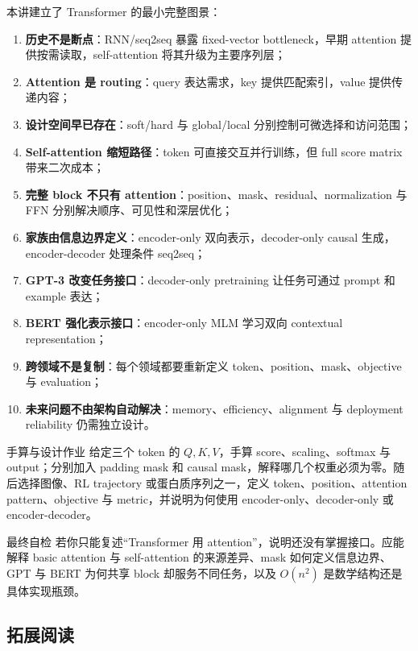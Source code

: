 \documentclass[a4paper]{article}
\begin{document}
本讲建立了 Transformer 的最小完整图景：

\begin{enumerate}
  \item \textbf{历史不是断点}：RNN/seq2seq 暴露 fixed-vector bottleneck，早期 attention 提供按需读取，self-attention 将其升级为主要序列层；
  \item \textbf{Attention 是 routing}：query 表达需求，key 提供匹配索引，value 提供传递内容；
  \item \textbf{设计空间早已存在}：soft/hard 与 global/local 分别控制可微选择和访问范围；
  \item \textbf{Self-attention 缩短路径}：token 可直接交互并行训练，但 full score matrix 带来二次成本；
  \item \textbf{完整 block 不只有 attention}：position、mask、residual、normalization 与 FFN 分别解决顺序、可见性和深层优化；
  \item \textbf{家族由信息边界定义}：encoder-only 双向表示，decoder-only causal 生成，encoder-decoder 处理条件 seq2seq；
  \item \textbf{GPT-3 改变任务接口}：decoder-only pretraining 让任务可通过 prompt 和 example 表达；
  \item \textbf{BERT 强化表示接口}：encoder-only MLM 学习双向 contextual representation；
  \item \textbf{跨领域不是复制}：每个领域都要重新定义 token、position、mask、objective 与 evaluation；
  \item \textbf{未来问题不由架构自动解决}：memory、efficiency、alignment 与 deployment reliability 仍需独立设计。
\end{enumerate}

\begin{importantbox}{手算与设计作业}
给定三个 token 的 $Q,K,V$，手算 score、scaling、softmax 与 output；分别加入 padding mask 和 causal mask，解释哪几个权重必须为零。随后选择图像、RL trajectory 或蛋白质序列之一，定义 token、position、attention pattern、objective 与 metric，并说明为何使用 encoder-only、decoder-only 或 encoder-decoder。
\end{importantbox}

\begin{warningbox}{最终自检}
若你只能复述“Transformer 用 attention”，说明还没有掌握接口。应能解释 basic attention 与 self-attention 的来源差异、mask 如何定义信息边界、GPT 与 BERT 为何共享 block 却服务不同任务，以及 $O(n^2)$ 是数学结构还是具体实现瓶颈。
\end{warningbox}

\subsection{拓展阅读}
\end{document}

